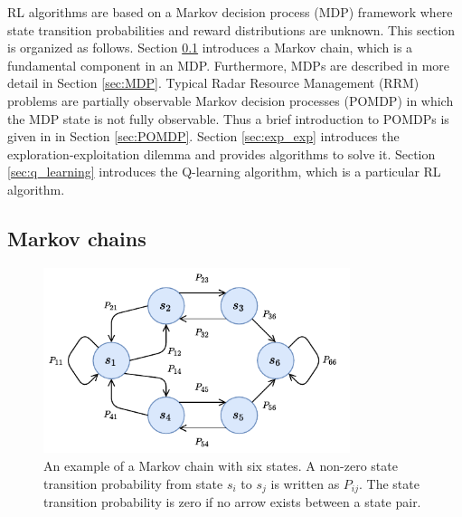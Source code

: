 \documentclass[english, 12pt, a4paper, elec, utf8, a-1b, online]{aaltothesis}
\begin{document}
RL algorithms are based on a Markov decision process (MDP) framework where state transition probabilities and reward distributions are unknown.
This section is organized as follows.
Section \ref{sec:MC} introduces a Markov chain, which is a fundamental component in an MDP.
Furthermore, MDPs are described in more detail in Section \ref{sec:MDP}.
Typical Radar Resource Management (RRM) problems are partially observable Markov decision processes (POMDP) in which the MDP state is not fully observable. 
Thus a brief introduction to POMDPs is given in in Section \ref{sec:POMDP}.
Section \ref{sec:exp_exp} introduces the exploration-exploitation dilemma and provides algorithms to solve it.
Section \ref{sec:q_learning} introduces the Q-learning algorithm, which is a particular RL algorithm.


\subsection{Markov chains} \label{sec:MC}

\begin{figure}[b]
    \centering
    \includegraphics[width=0.8\textwidth]{figures/MarkovChain.pdf}
    \caption{
    An example of a Markov chain with six states. 
    A non-zero state transition probability from state $s_i$ to $s_j$ is written as $P_{ij}$.
    The state transition probability is zero if no arrow exists between a state pair. }
    \label{fig:mc}
\end{figure}
\end{document}

